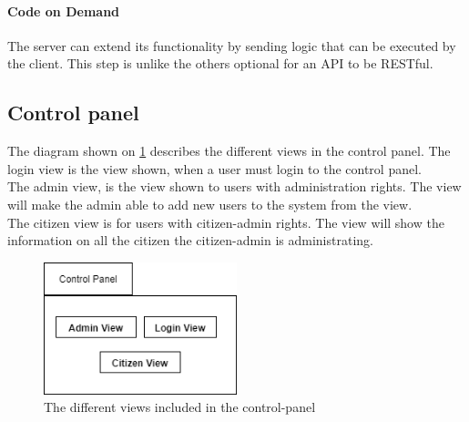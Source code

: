 \paragraph{Code on Demand} The server can extend its functionality by sending logic that can be executed by the client. This step is unlike the others optional for an API to be RESTful.

\subsection{Control panel}
The diagram shown on \ref{fig:controlpanel} describes the different views in the control panel. The login view is the view shown, when a user must login to the control panel.\\
The admin view, is the view shown to users with administration rights. The view will make the admin able to add new users to the system from the view.\\
The citizen view is for users with citizen-admin rights. The view will show the information on all the citizen the citizen-admin is administrating.

\begin{figure}[H]
    \centering
    \includegraphics[width=0.5\textwidth]{Figures/ControlPanel.png}
    \caption{The different views included in the control-panel}
    \label{fig:controlpanel}
\end{figure}

